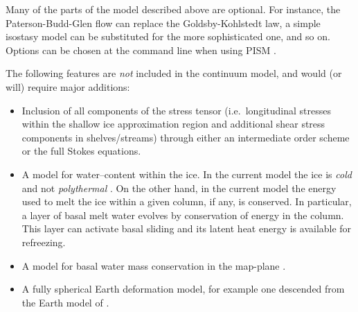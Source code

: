 \documentclass[12pt,final]{amsart}%
\theoremstyle{plain}
\theoremstyle{definition}
\theoremstyle{remark}
\begin{document}
Many of the parts of the model described above are optional.  For instance, the Paterson-Budd-Glen \citep{PatersonBudd} flow can replace the Goldsby-Kohlstedt law, a simple isostasy model can be substituted for the more sophisticated one, and so on.  Options can be chosen at the command line when using PISM \citep{pism-web-page}.

The following features are \emph{not} included in the continuum model, and would (or will) require major additions:
\begin{itemize}
\item Inclusion of all components of the stress tensor (i.e.~longitudinal stresses within the shallow ice approximation region and additional shear stress components in shelves/streams) through either an intermediate order scheme \citep{Blatter,SaitoEISMINT} or the full Stokes equations.
\item A model for water--content within the ice.  In the current model the ice is \emph{cold} and not \emph{polythermal} \citep[compare][]{Greve}.  On the other hand, in the current model the energy used to melt the ice within a given column, if any, is conserved.  In particular, a layer of basal melt water evolves by conservation of energy in the column.  This layer can activate basal sliding and its latent heat energy is available for refreezing.
\item A model for basal water mass conservation in the map-plane \citep[compare][]{JohnsonFastook}.
\item A fully spherical Earth deformation model, for example one descended from the Earth model of \citet{Peltier}.
\end{itemize}
\end{document}
